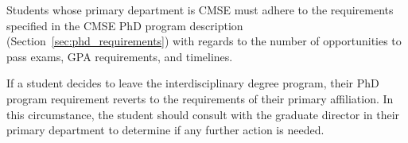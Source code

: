 Students whose primary department is CMSE must adhere to the
requirements specified in the CMSE PhD program description
(Section~\ref{sec:phd_requirements}) with regards to the number of
opportunities to pass exams, GPA requirements, and timelines.

If a student decides to leave the interdisciplinary degree program,
their PhD program requirement reverts to the requirements of their
primary affiliation.  In this circumstance, the student should consult
with the graduate director in their primary department to determine if
any further action is needed.
